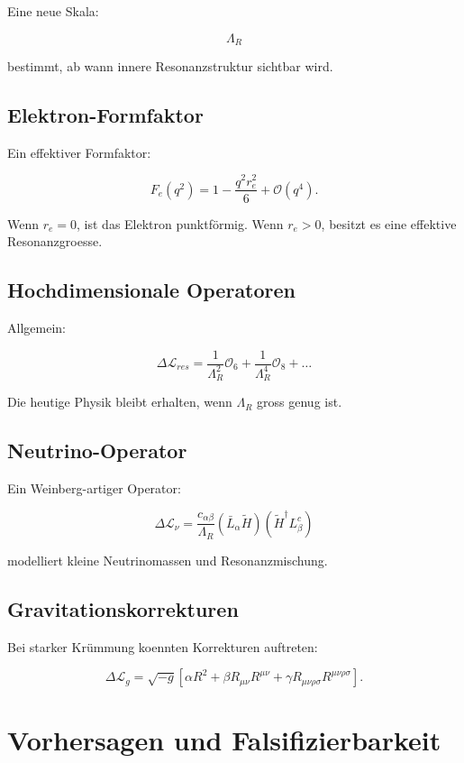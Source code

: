 \documentclass[11pt,a4paper]{article}
\begin{document}
Eine neue Skala:

\[
\Lambda_R
\]

bestimmt, ab wann innere Resonanzstruktur sichtbar wird.

\subsection{Elektron-Formfaktor}

Ein effektiver Formfaktor:

\[
F_e(q^2)=1-\frac{q^2r_e^2}{6}+\mathcal{O}(q^4).
\]

Wenn $r_e=0$, ist das Elektron punktförmig. Wenn $r_e>0$, besitzt es eine effektive Resonanzgroesse.

\subsection{Hochdimensionale Operatoren}

Allgemein:

\[
\Delta\mathcal{L}_{res}
=
\frac{1}{\Lambda_R^2}\mathcal{O}_6
+
\frac{1}{\Lambda_R^4}\mathcal{O}_8
+\ldots
\]

Die heutige Physik bleibt erhalten, wenn $\Lambda_R$ gross genug ist.

\subsection{Neutrino-Operator}

Ein Weinberg-artiger Operator:

\[
\Delta\mathcal{L}_\nu
=
\frac{c_{\alpha\beta}}{\Lambda_R}
(\bar{L}_\alpha \tilde{H})
(\tilde{H}^\dagger L_\beta^c)
\]

modelliert kleine Neutrinomassen und Resonanzmischung.

\subsection{Gravitationskorrekturen}

Bei starker Krümmung koennten Korrekturen auftreten:

\[
\Delta\mathcal{L}_g
=
\sqrt{-g}
\left[
\alpha R^2
+
\beta R_{\mu\nu}R^{\mu\nu}
+
\gamma R_{\mu\nu\rho\sigma}R^{\mu\nu\rho\sigma}
\right].
\]

\section{Vorhersagen und Falsifizierbarkeit}
\end{document}
